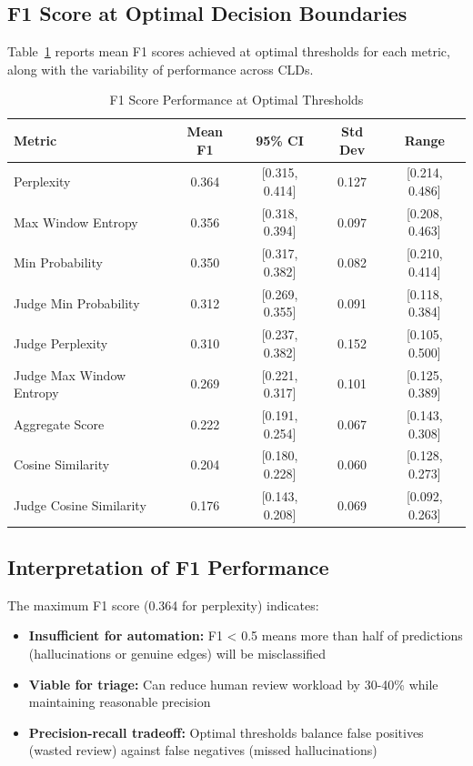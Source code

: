 \subsection{F1 Score at Optimal Decision Boundaries}

Table~\ref{tab:rq2_f1_thresholds} reports mean F1 scores achieved at optimal thresholds for each metric, along with the variability of performance across CLDs.

\begin{table}[h]
\centering
\small
\caption{F1 Score Performance at Optimal Thresholds}
\label{tab:rq2_f1_thresholds}
\begin{tabular}{lcccc}
\toprule
\textbf{Metric} & \textbf{Mean F1} & \textbf{95\% CI} & \textbf{Std Dev} & \textbf{Range} \\
\midrule
Perplexity                & 0.364 & [0.315, 0.414] & 0.127 & [0.214, 0.486] \\
Max Window Entropy        & 0.356 & [0.318, 0.394] & 0.097 & [0.208, 0.463] \\
Min Probability           & 0.350 & [0.317, 0.382] & 0.082 & [0.210, 0.414] \\
Judge Min Probability     & 0.312 & [0.269, 0.355] & 0.091 & [0.118, 0.384] \\
Judge Perplexity          & 0.310 & [0.237, 0.382] & 0.152 & [0.105, 0.500] \\
Judge Max Window Entropy  & 0.269 & [0.221, 0.317] & 0.101 & [0.125, 0.389] \\
Aggregate Score           & 0.222 & [0.191, 0.254] & 0.067 & [0.143, 0.308] \\
Cosine Similarity         & 0.204 & [0.180, 0.228] & 0.060 & [0.128, 0.273] \\
Judge Cosine Similarity   & 0.176 & [0.143, 0.208] & 0.069 & [0.092, 0.263] \\
\bottomrule
\end{tabular}
\end{table}

\subsection{Interpretation of F1 Performance}

The maximum F1 score (0.364 for perplexity) indicates:

\begin{itemize}
    \item \textbf{Insufficient for automation:} F1 < 0.5 means more than half of predictions (hallucinations or genuine edges) will be misclassified
    \item \textbf{Viable for triage:} Can reduce human review workload by 30-40\% while maintaining reasonable precision
    \item \textbf{Precision-recall tradeoff:} Optimal thresholds balance false positives (wasted review) against false negatives (missed hallucinations)
\end{itemize}

